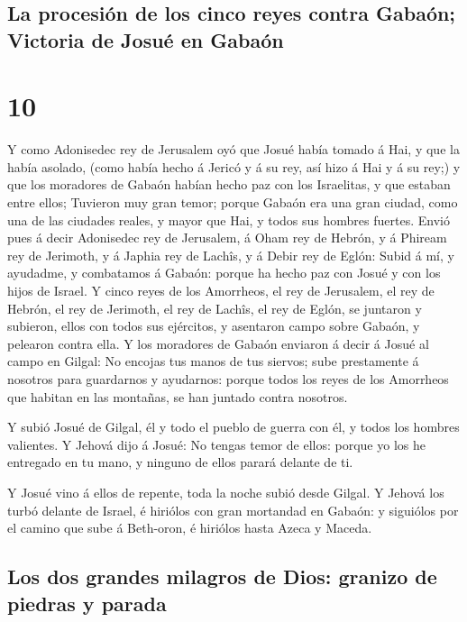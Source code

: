 \hypertarget{la-procesiuxf3n-de-los-cinco-reyes-contra-gabauxf3n-victoria-de-josuuxe9-en-gabauxf3n}{%
\subsection{La procesión de los cinco reyes contra Gabaón; Victoria de
Josué en
Gabaón}\label{la-procesiuxf3n-de-los-cinco-reyes-contra-gabauxf3n-victoria-de-josuuxe9-en-gabauxf3n}}

\hypertarget{section-9}{%
\section{10}\label{section-9}}

 Y como Adonisedec rey de Jerusalem oyó que Josué había
tomado á Hai, y que la había asolado, (como había hecho á Jericó y á su
rey, así hizo á Hai y á su rey;) y que los moradores de Gabaón habían
hecho paz con los Israelitas, y que estaban entre ellos; 
Tuvieron muy gran temor; porque Gabaón era una gran ciudad, como una de
las ciudades reales, y mayor que Hai, y todos sus hombres fuertes.
 Envió pues á decir Adonisedec rey de Jerusalem, á Oham rey
de Hebrón, y á Phiream rey de Jerimoth, y á Japhia rey de Lachîs, y á
Debir rey de Eglón:  Subid á mí, y ayudadme, y combatamos á
Gabaón: porque ha hecho paz con Josué y con los hijos de Israel.
 Y cinco reyes de los Amorrheos, el rey de Jerusalem, el rey
de Hebrón, el rey de Jerimoth, el rey de Lachîs, el rey de Eglón, se
juntaron y subieron, ellos con todos sus ejércitos, y asentaron campo
sobre Gabaón, y pelearon contra ella.  Y los moradores de
Gabaón enviaron á decir á Josué al campo en Gilgal: No encojas tus manos
de tus siervos; sube prestamente á nosotros para guardarnos y ayudarnos:
porque todos los reyes de los Amorrheos que habitan en las montañas, se
han juntado contra nosotros.

 Y subió Josué de Gilgal, él y todo el pueblo de guerra con
él, y todos los hombres valientes.  Y Jehová dijo á Josué:
No tengas temor de ellos: porque yo los he entregado en tu mano, y
ninguno de ellos parará delante de ti.

 Y Josué vino á ellos de repente, toda la noche subió desde
Gilgal.  Y Jehová los turbó delante de Israel, é hiriólos
con gran mortandad en Gabaón: y siguiólos por el camino que sube á
Beth-oron, é hiriólos hasta Azeca y Maceda.

\hypertarget{los-dos-grandes-milagros-de-dios-granizo-de-piedras-y-parada}{%
\subsection{Los dos grandes milagros de Dios: granizo de piedras y
parada}\label{los-dos-grandes-milagros-de-dios-granizo-de-piedras-y-parada}}

